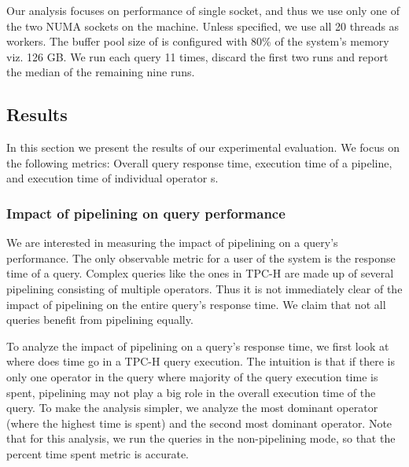 Our analysis focuses on performance of single socket, and thus we use only one of the two NUMA sockets on the machine.
Unless specified, we use all 20 threads as \sys{} workers.
The buffer pool size of \sys{} is configured with 80\% of the system's memory viz. 126 GB.
We run each query 11 times, discard the first two runs and report the median of the remaining nine runs. 



\subsection{Results}
In this section we present the results of our experimental evaluation. 
We focus on the following metrics: Overall query response time, execution time of a pipeline, and execution time of individual operator \wo{}s.

\subsubsection{Impact of pipelining on query performance}
We are interested in measuring the impact of pipelining on a query's performance.
The only observable metric for a user of the system is the response time of a query.
Complex queries like the ones in TPC-H are made up of several pipelining consisting of multiple operators.
Thus it is not immediately clear of the impact of pipelining on the entire query's response time. 
%
We claim that not all queries benefit from pipelining equally.

To analyze the impact of pipelining on a query's response time, we first look at where does time go in a TPC-H query execution.
The intuition is that if there is only one operator in the query where majority of the query execution time is spent, pipelining may not play a big role in the overall execution time of the query.
To make the analysis simpler, we analyze the most dominant operator (where the highest time is spent) and the second most dominant operator. 
Note that for this analysis, we run the queries in the non-pipelining mode, so that the percent time spent metric is accurate.

